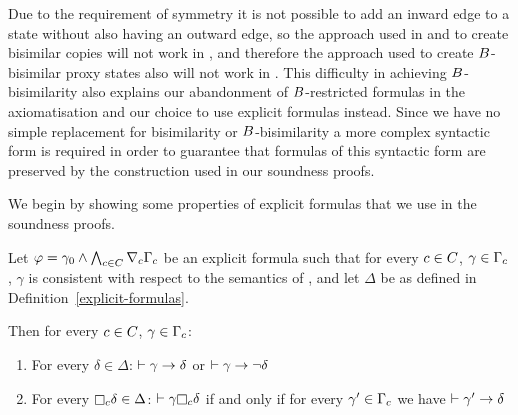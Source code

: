 Due to the requirement of symmetry it is not possible to add an inward edge to a state without also having an outward edge, so the approach used in \logicRmlKFF{} and \logicRmlKD{} to create bisimilar copies will not work in \logicRmlS{}, and therefore the approach used to create $B$-bisimilar proxy states also will not work in \logicRmlS{}.
This difficulty in achieving $B$-bisimilarity also explains our abandonment of $B$-restricted formulas in the axiomatisation \axiomRmlS{} and our choice to use explicit formulas instead.
Since we have no simple replacement for bisimilarity or $B$-bisimilarity a more complex syntactic form is required in order to guarantee that formulas of this syntactic form are preserved by the construction used in our soundness proofs.

We begin by showing some properties of explicit formulas that we use in the soundness proofs.

\begin{lemma}
    Let $\varphi = \gamma_0 \land \bigwedge_{c \in C} \nabla_{c} \Gamma_c$ be an explicit formula such that for every $c \in C$, $\gamma \in \Gamma_c$, $\gamma$ is consistent with respect to the semantics of \logicRmlS{}, and let $\Delta$ be as defined in Definition~\ref{explicit-formulas}.

    Then for every $c \in C$, $\gamma \in \Gamma_c$:
    \begin{enumerate}
        \item For every $\delta \in \Delta$: $\vdash \gamma \rightarrow \delta$ or $\vdash \gamma \rightarrow \lnot \delta$
        \item For every $\necessaryC \delta \in \Delta$: $\proves \gamma \necessaryC \delta$ if and only if for every $\gamma' \in \Gamma_c$ we have $\vdash \gamma' \rightarrow \delta$
    \end{enumerate}
\end{lemma}

